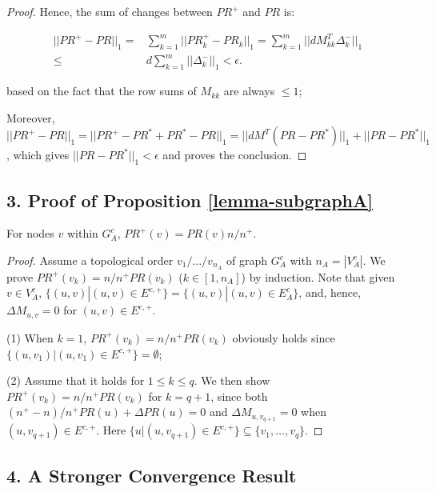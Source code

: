 \begin{proof}
Hence, the sum of changes between $PR^+$ and $PR$ is:

\vspace{-1ex}
\begin{small}
\begin{equation*}
\begin{split}
||PR^+-PR||_1=&\sum_{k=1}^m ||PR_k^+-PR_k||_1=\sum_{k=1}^m ||d M_{kk}^T \Delta_k^-||_1 \\
\le & d\sum_{k=1}^m ||\Delta_k^-||_1 < \epsilon.
\end{split}
\end{equation*}
\end{small}

\vspace{-1ex}
\noindent
based on the fact that the row sums of $M_{kk}$ are always $\le 1$; %

Moreover, $||PR^+-PR||_1 = ||PR^+ - PR^* + PR^* -PR||_1 = ||d M^T (PR-PR^*)||_1 + ||PR-PR^*||_1$, which gives $||PR-PR^*||_1<\epsilon$ and proves the conclusion.
\end{proof}


\subsection*{3. Proof of Proposition \ref{lemma-subgraphA}}
For nodes $v$ within $G^c_A$, $PR^+(v)= PR(v) {n}/{n^+}$.

\begin{proof}
Assume a topological order $v_1/\dots/v_{n_A}$ of graph $G^c_A$ with $n_A=|V^c_A|$.
We prove $PR^+(v_k)={n}/{n^+} PR(v_k)$ ($k\in [1,n_A]$) by induction.
%
Note that given $v\in V^c_A$, $\{(u,v)|(u,v)\in E^{c,+}\}=\{(u,v)|(u,v)\in E^c_A\}$, and, hence, $\Delta M_{u,v} =0$ for $(u,v)\in E^{c,+}$.

\noindent(1) When $k=1$, $PR^+(v_k)={n}/{n^+} PR(v_k)$ obviously holds since $\{(u,v_1)|(u,v_1)\in E^{c,+}\}=\emptyset$;

\noindent(2) Assume that it holds for $1\le k\le q$. We then show $PR^+(v_k)={n}/{n^+} PR(v_k)$ for $k=q+1$, since both ${(n^+-n)}/{n^+} PR(u) + \Delta PR(u)=0$ and $\Delta M_{u,v_{q+1}}=0$ when $(u,v_{q+1})\in E^{c,+}$.
Here $\{u|(u,v_{q+1})\in E^{c,+}\}\subseteq \{v_1,\dots,v_q\}$.
\end{proof}


\subsection*{4. A Stronger Convergence Result}

